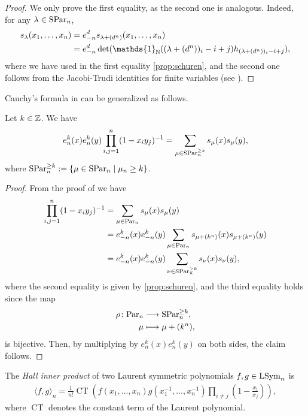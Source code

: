\documentclass[11pt]{amsart}
\begin{document}
\begin{proof}
    We only prove the first equality, as the second one is analogous. Indeed, for any $\lambda \in \mathrm{SPar}_n$,
    \begin{align*}
        s_{\lambda}(x_1,\dots,x_n) &=e_{-n}^ds_{\lambda + (d^n)}(x_1,\dots,x_n) \\&= e_{-n}^d\det(\mathds{1}_\N((\lambda + (d^n))_i - i + j)h_{(\lambda + (d^n))_i - i + j}),
    \end{align*}
where we have used in the first equality \cref{prop:schuren}, and the second one follows from the Jacobi-Trudi identities for finite variables (see \cite[Ch.~I, \S 3, Eqs.3.4-3.5]{Mac15}).
\end{proof}

Cauchy's formula in \cite[Ch.~I, Eq.~(4.3)]{Mac15}
can be generalized as follows.
\begin{prop}
     Let $k \in \mathbb{Z}$. We have
     \begin{align}
         e_n^k(x)e_n^k(y)\prod_{i,j =1}^n(1 - x_iy_j)^{-1} = \sum_{\mu \in \mathrm{SPar}_n^{\geq k}}s_\mu(x)s_\mu(y),
     \end{align}
     where $\mathrm{SPar}_n^{\geq k}:= \{\mu \in \mathrm{SPar}_n \mid \mu_n \geq k\}$. 
\end{prop}

\begin{proof}
    From the proof of \cite[Ch.~I, \S3, Eq.~(4.3)]{Mac15}
    we have
    \begin{align*}
        \prod_{i,j =1}^n(1 - x_iy_j)^{-1} &= \sum_{\mu \in \mathrm{Par}_n}s_\mu(x)s_\mu(y) \\&= e_{-n}^k(x) e_{-n}^k(y)\sum_{\mu \in \mathrm{Par}_n}s_{\mu {+} (k^n)}(x)s_{\mu {+} (k^n)}(y)
        \\ &= e_{-n}^k(x) e_{-n}^k(y)\sum_{\nu \in \mathrm{SPar}_n^{\geq k}}s_{\nu}(x)s_{\nu}(y),
    \end{align*}
    where the second equality is given by \cref{prop:schuren}, and the third equality holds since the map 
    \begin{align*}
        \rho \colon \mathrm{Par}_n &\longrightarrow\mathrm{SPar}_n^{\geq k},\\
        \mu &\longmapsto \mu+ (k^n),
    \end{align*}
    is bijective. 
    Then, by multiplying by $e_n^k(x)e_n^k(y)$ on both sides, the claim follows.
\end{proof}

    \begin{defin}\label{def:hall}
        The 
        \emph{Hall inner product}
        of two Laurent symmetric polynomials $f,g \in \mathrm{LSym}_n$ is
        \begin{align}
            \langle f, g \rangle_n
            = \frac{1}{n!} \operatorname{CT} \left( f(x_1, \dots , x_n) g(x_1^{-1}, \dots, x_n^{-1}) \prod_{i \ne j} \left(1 - \frac{x_i}{x_j}\right) \right), \label{eq:Hall-IP}
        \end{align}
        where $\operatorname{CT}$ denotes the constant term of the Laurent polynomial.
    \end{defin}
 
\end{document}
